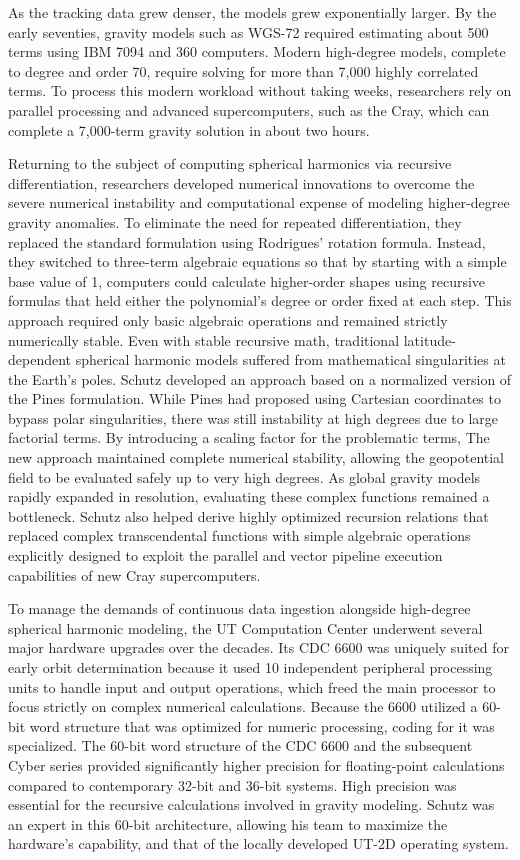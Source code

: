 As the tracking data grew denser, the models grew exponentially larger. By the early seventies, gravity models such as WGS-72 required estimating about 500 terms using IBM 7094 and 360 computers. Modern high-degree models, complete to degree and order 70, require solving for more than 7,000 highly correlated terms. To process this modern workload without taking weeks, researchers rely on parallel processing and advanced supercomputers, such as the Cray, which can complete a 7,000-term gravity solution in about two hours. 

Returning to the subject of computing spherical harmonics via recursive differentiation, researchers developed numerical innovations to overcome the severe numerical instability and computational expense of modeling higher-degree gravity anomalies. To eliminate the need for repeated differentiation, they replaced the standard formulation using Rodrigues' rotation formula. Instead, they switched to three-term algebraic equations so that by starting with a simple base value of 1, computers could calculate higher-order shapes using recursive formulas that held either the polynomial's degree or order fixed at each step. This approach required only basic algebraic operations and remained strictly numerically stable. 
Even with stable recursive math, traditional latitude-dependent spherical harmonic models suffered from mathematical singularities at the Earth’s poles. Schutz developed an approach based on a normalized version of the Pines formulation. While Pines had proposed using Cartesian coordinates to bypass polar singularities, there was still instability at high degrees due to large factorial terms. By introducing a scaling factor for the problematic terms, The new approach maintained complete numerical stability, allowing the geopotential field to be evaluated safely up to very high degrees. As global gravity models rapidly expanded in resolution, evaluating these complex functions remained a bottleneck. Schutz also helped derive highly optimized recursion relations that replaced complex transcendental functions with simple algebraic operations explicitly designed to exploit the parallel and vector pipeline execution capabilities of new Cray supercomputers.

To manage the demands of continuous data ingestion alongside high-degree spherical harmonic modeling, the UT Computation Center underwent several major hardware upgrades over the decades. Its CDC 6600 was uniquely suited for early orbit determination because it used 10 independent peripheral processing units to handle input and output operations, which freed the main processor to focus strictly on complex numerical calculations. Because the 6600 utilized a 60-bit word structure that was optimized for numeric processing, coding for it was specialized. The 60-bit word structure of the CDC 6600 and the subsequent Cyber series provided significantly higher precision for floating-point calculations compared to contemporary 32-bit and 36-bit systems. High precision was essential for the recursive calculations involved in gravity modeling. Schutz was an expert in this 60-bit architecture, allowing his team to maximize the hardware’s capability, and that of the locally developed UT-2D operating system.

